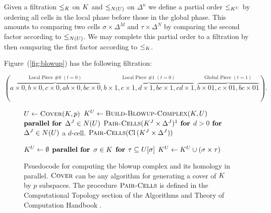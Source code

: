 \documentclass{elsarticle}
\begin{document}
Given a filtration $\leq_{K}$ on $K$ and $\leq_{N(U)}$ on $\Delta^n$ we define a partial order $\leq_{{K^U}}$ by 
ordering all cells in the local phase before those in the global phase. This amounts to 
comparing two cells $\sigma \times \Delta^M$ and $\tau \times \Delta^N$ by  
comparing the second factor according to $\leq_{N(U)}$. We may complete this partial order to a filtration by then comparing the 
first factor according to $\leq_{K}$. 
\begin{example}
Figure~(\ref{fig:blowup}) has the following filtration: 
\begin{linenomath*}
\begin{equation*}
(\overbrace{a \times 0, b \times 0 ,c \times 0,  ab \times 0, bc \times 0}^
{\textrm{Local Piece \#0 } (t=0)},
\overbrace{b \times 1 , c \times 1, d \times 1, bc \times 1, cd \times 1}^
{\textrm{Local Piece \#1 }(t=0)},
\overbrace{b \times 01, c \times 01, bc \times 01}^
{\textrm{Global Piece } (t=1)}).
\end{equation*}
\end{linenomath*}
\end{example}
\begin{figure}
\centering
\begin{minipage}[t]{.45\textwidth}
\begin{codebox}
 \li  $U \gets \textnormal{\scshape Cover}(K, p)$
 \li  $K^{U} \gets \textnormal{\scshape Build-Blowup-Complex}(K, U)$
 \li  $\textbf{parallel for}$   $\Delta^J \in N(U)$
 \li  \Do $\proc{Pair-Cells}(\K^{J} \times \Delta^{J})\footnotemark$
      \End
\li $\textbf{for}$ $d > 0$
 \li \Do $\textbf{for}$ $\Delta^J \in N(U)$ a $d$-cell.
 \li  \Do $\textnormal{\scshape Pair-Cells}(\operatorname{Cl}{(K^{J} \times \Delta^{J})})$ 
\end{codebox}
\end{minipage}
\begin{minipage}[t]{.45\textwidth}
\begin{codebox}
\li $K^{U} \gets \emptyset$
\li $\textbf{parallel for}$ $\sigma \in K$
\li \Do $\textbf{for}$ $\tau \subseteq U[\sigma]$
\li \Do $K^{U} \gets K^{U} \cup (\sigma \times \tau)$ 
\end{codebox}
\end{minipage}
\caption{Psuedocode for computing the blowup complex and its homology in parallel. $\textnormal{\scshape Cover}$ can be any algorithm for generating a cover of $K$ by $p$ subspaces. The procedure $\textnormal{\scshape Pair-Cells}$ is defined in the Computational Topology section of the Algorithms and Theory of Computation Handbook \cite[\textrm{Page } 3-17]{z-ct-10}.}
\label{fig:multicore-code}
\end{figure}
\end{document}
